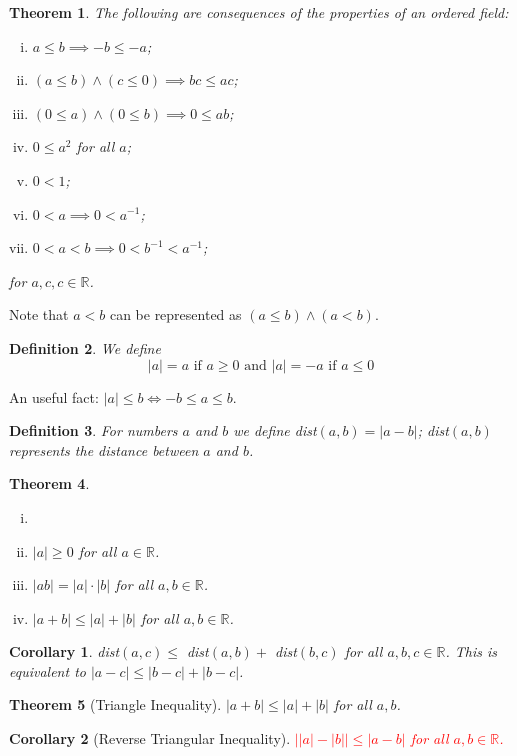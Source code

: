 \documentclass[12pt, lettersize]{book}
\newtheorem{thm}{Theorem}[section]
\newtheorem{dfn}[thm]{Definition}
\newtheorem{cor}{Corollary}[thm]
\newcommand{\R}{\mathbb{R}}
\begin{document}
		\begin{thm}\label{thm:3.2}
		The following are consequences of the properties of an ordered field:
		\begin{enumerate}[(i)]
			\item $a\leq b\implies-b\leq-a$;
			\item $(a\leq b)\land(c\leq0)\implies bc\leq ac$;
			\item $(0\leq a)\land(0\leq b)\implies 0\leq ab$;
			\item $0\leq a^2$ for all $a$;
			\item $0<1$;
			\item $0<a\implies0< a^{-1}$;
			\item $0<a<b\implies0<b^{-1}<a^{-1}$;
		\end{enumerate}
		for $a,c,c\in\R$.
		\end{thm}
		Note that $a<b$ can be represented as $(a\leq b)\land(a<b)$.
		
		\begin{dfn}\label{def:3.3}
		We define
		\begin{displaymath}
			\text{$|a|=a$ if $a\geq0$  and   $|a|=-a$ if $a\leq0$}
		\end{displaymath}
		\end{dfn}
	
		An useful fact: $|a|\leq b\iff -b\leq a\leq b$.
		
		\begin{dfn}\label{def:3.4}
		For numbers $a$ and $b$ we define dist$(a,b)=|a-b|$; dist$(a,b)$ represents the \emph{distance between $a$ and $b$}.
		\end{dfn}
		
		\begin{thm}\label{thm:3.5}
		\begin{enumerate}[(i)]
			\item[]
			\item $|a|\geq0$ for all $a\in\R$.
			\item $|ab|=|a|\cdot|b|$ for all $a,b\in\R$.
			\item $|a+b|\leq|a|+|b|$ for all $a,b\in\R$. 
		\end{enumerate}
		\end{thm}
		
		\begin{cor}\label{cor:3.6}
		dist$(a,c)\leq$ dist$(a,b)+$ dist$(b,c)$ for all $a,b,c\in\R$. This is equivalent to $|a-c|\leq|b-c|+|b-c|$.
		\end{cor}
		
		\begin{thm}[Triangle Inequality]\label{thm:3.7}
		$|a+b|\leq|a|+|b|$ for all $a,b$.
		\end{thm}
		\begin{cor}[Reverse Triangular Inequality]\label{cor: reverse triangular}
		\textcolor{red}{$\big||a|-|b|\big|\leq|a-b|$ for all $a,b\in\R$.}	
		\end{cor}
	
\end{document}
